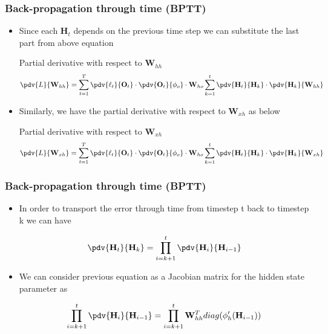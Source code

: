 \documentclass[11pt,]{beamer}
\begin{document}
\begin{frame}
	\frametitle{Back-propagation through time (BPTT)}
	\begin{itemize}
		\item Since each $\mathbf{H}_t$ depends on the previous time step we can substitute the last part from above equation
	\begin{block}{Partial derivative with respect to $\mathbf{W}_{hh}$}
		\begin{equation*}
			\pdv{L}{\mathbf{W}_{hh}} = \sum_{t=1}^T \pdv{\ell_t}{\mathbf{O}_t} \cdot \pdv{\mathbf{O}_t}{\phi_o} \cdot \mathbf{W}_{ho} \sum_{k=1}^t \pdv{\mathbf{H}_t}{\mathbf{H}_k} \cdot \pdv{\mathbf{H}_k}{\mathbf{W}_{hh}}
		\end{equation*}
	\end{block}
		\item Similarly, we have the partial derivative with respect to $\mathbf{W}_{xh}$ as below
	\begin{block}{Partial derivative with respect to $\mathbf{W}_{xh}$}
		\begin{equation*}
			\pdv{L}{\mathbf{W}_{xh}} = \sum_{t=1}^T \pdv{\ell_t}{\mathbf{O}_t} \cdot \pdv{\mathbf{O}_t}{\phi_o} \cdot \mathbf{W}_{ho} \sum_{k=1}^t \pdv{\mathbf{H}_t}{\mathbf{H}_k} \cdot \pdv{\mathbf{H}_k}{\mathbf{W}_{xh}}
		\end{equation*}
	\end{block}
\end{itemize}
\end{frame}

\begin{frame}
	\frametitle{Back-propagation through time (BPTT)}
	\begin{itemize}
		\item In order to transport the error through time from timestep t back
		to timestep k we can have
	\begin{block}{}
		\begin{equation*}
			\pdv{\mathbf{H}_t}{\mathbf{H}_k} = \prod_{i = k + 1}^t \pdv{\mathbf{H}_i}{\mathbf{H}_{i-1}}
		\end{equation*}
	\end{block}
		\item We can consider previous equation as a Jacobian matrix for the hidden state parameter as
	\begin{block}{}
		\begin{equation*}
			\prod_{i = k + 1}^t \pdv{\mathbf{H}_i}{\mathbf{H}_{i-1}} = \prod_{i = k+1}^t \mathbf{W}_{hh}^T diag(\phi'_{h}(\mathbf{H}_{i-1}))
		\end{equation*}
	\end{block}
\end{itemize}
\end{frame}
\end{document}
